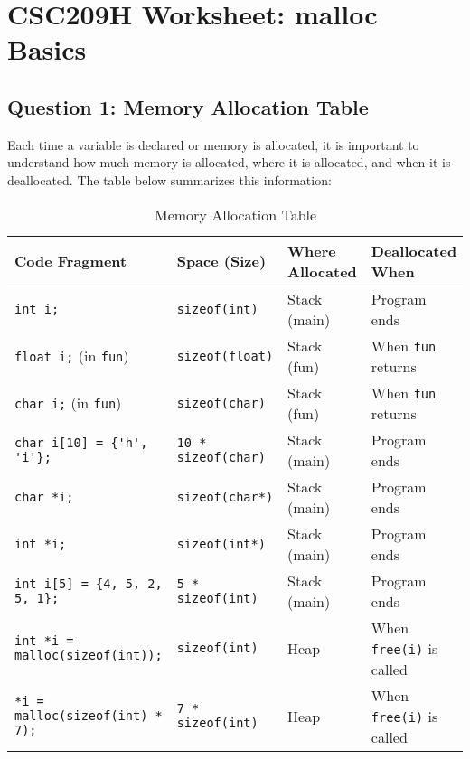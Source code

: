 \documentclass[12pt]{article}
\begin{document}
\renewcommand{\familydefault}{\rmdefault}

\section*{CSC209H Worksheet: malloc Basics}

\subsection*{Question 1: Memory Allocation Table}
Each time a variable is declared or memory is allocated, it is important to understand how much memory is allocated, where it is allocated, and when it is deallocated. The table below summarizes this information:

\begin{table}[h!]
    \centering
    \begin{tabular}{|l|l|l|l|}
        \hline
        \textbf{Code Fragment} & \textbf{Space (Size)} & \textbf{Where Allocated} & \textbf{Deallocated When} \\ \hline
        \verb|int i;| & \verb|sizeof(int)| & Stack (main) & Program ends \\ \hline
        \verb|float i;| (in \verb|fun|) & \verb|sizeof(float)| & Stack (fun) & When \verb|fun| returns \\ \hline
        \verb|char i;| (in \verb|fun|) & \verb|sizeof(char)| & Stack (fun) & When \verb|fun| returns \\ \hline
        \verb|char i[10] = {'h', 'i'};| & \verb|10 * sizeof(char)| & Stack (main) & Program ends \\ \hline
        \verb|char *i;| & \verb|sizeof(char*)| & Stack (main) & Program ends \\ \hline
        \verb|int *i;| & \verb|sizeof(int*)| & Stack (main) & Program ends \\ \hline
        \verb|int i[5] = {4, 5, 2, 5, 1};| & \verb|5 * sizeof(int)| & Stack (main) & Program ends \\ \hline
        \verb|int *i = malloc(sizeof(int));| & \verb|sizeof(int)| & Heap & When \verb|free(i)| is called \\ \hline
        \verb|*i = malloc(sizeof(int) * 7);| & \verb|7 * sizeof(int)| & Heap & When \verb|free(i)| is called \\ \hline
    \end{tabular}
    \caption{Memory Allocation Table}
    \label{tab:memory_allocation}
\end{table}
\end{document}
